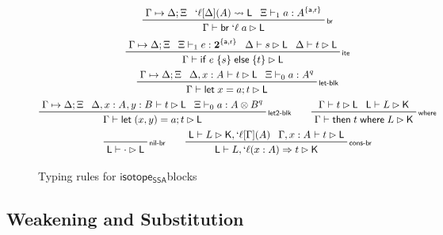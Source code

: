 \documentclass[acmsmall,screen,review]{acmart}
\newcommand{\mb}[1]{\ensuremath{\mathbf{#1}}}
\newcommand{\ms}[1]{\ensuremath{\mathsf{#1}}}
\newcommand{\lbl}[1]{{`#1}}
\newcommand{\lto}{\Rightarrow}
\newcommand{\letstmt}[3]{\ensuremath{\ms{let}\;#1 = #2; #3}}
\newcommand{\brb}[2]{\ms{br}\;#1\;#2}
\newcommand{\lbrb}[2]{\brb{\lbl{#1}}{#2}}
\newcommand{\ite}[3]{\ms{if}\;#1\;\{#2\}\;\ms{else}\;\{#3\}}
\newcommand{\ewhere}[2]{\ms{then}\;#1\;\ms{where}\;#2}
\newcommand{\wbranch}[3]{#1(#2) \lto #3}
\newcommand{\lwbranch}[3]{\wbranch{\lbl{#1}}{#2}{#3}}
\newcommand{\csplits}[3]{#1 \mapsto #2;#3}
\newcommand{\lwk}[2]{#1 \rightsquigarrow #2}
\newcommand{\thyp}[3]{#1: {#2}^{#3}}
\newcommand{\lhyp}[3]{#1[#2](#3)}
\newcommand{\llhyp}[3]{\lhyp{\lbl{#1}}{#2}{#3}}
\newcommand{\rle}[1]{{\scriptsize\textsf{#1}}}
\newcommand{\tint}{{\{\ms{a}, \ms{r}\}}}
\newcommand{\hasty}[5]{#1 \vdash_{#2} #3: {#4}^{#5}}
\newcommand{\haslb}[3]{#1 \vdash #2 \rhd #3}
\newcommand{\lhaslb}[3]{#1 \vdash #2 \rhd #3}
\newcommand{\isotopessa}{\ms{isotope_{SSA}}}
\begin{document}
\begin{figure}
  \begin{gather*}    
    \prftree[r]{\rle{br}}
      {\csplits{\Gamma}{\Delta}{\Xi}}
      {\lwk{\llhyp{\ell}{\Delta}{A}}{\ms{L}}}
      {\hasty{\Xi}{1}{a}{A}{\tint}}
      {\haslb{\Gamma}{\lbrb{\ell}{a}}{\ms{L}}} 
    \\
    \prftree[r]{\rle{ite}}
      {\csplits{\Gamma}{\Delta}{\Xi}}
      {\hasty{\Xi}{1}{e}{\mb{2}}{\tint}}
      {\haslb{\Delta}{s}{\ms{L}}}
      {\haslb{\Delta}{t}{\ms{L}}}
      {\haslb{\Gamma}{\ite{e}{s}{t}}{\ms{L}}} 
    \\
    \prftree[r]{\rle{let-blk}}
      {\csplits{\Gamma}{\Delta}{\Xi}}
      {\haslb{\Delta, \thyp{x}{A}{}}{t}{\ms{L}}}
      {\hasty{\Xi}{0}{a}{A}{q}}
      {\haslb{\Gamma}{\letstmt{x}{a}{t}}{\ms{L}}} 
    \\
    \prftree[r]{\rle{let2-blk}}
      {\csplits{\Gamma}{\Delta}{\Xi}}
      {\haslb{\Delta, \thyp{x}{A}{}, \thyp{y}{B}{}}{t}{\ms{L}}}
      {\hasty{\Xi}{0}{a}{A \otimes B}{q}}
      {\haslb{\Gamma}{\letstmt{(x, y)}{a}{t}}{\ms{L}}} \qquad
    \prftree[r]{\rle{where}}
      {\haslb{\Gamma}{t}{\ms{L}}}
      {\lhaslb{\ms{L}}{L}{\ms{K}}}
      {\haslb{\Gamma}{\ewhere{t}{L}}{\ms{K}}}
    \\
    \prftree[r]{\rle{nil-br}}
      {\lhaslb{\ms{L}}{\cdot}{\ms{L}}} \qquad
    \prftree[r]{\rle{cons-br}}
      {\lhaslb{\ms{L}}{L}{\ms{K}, \llhyp{\ell}{\Gamma}{A}}}
      {\haslb{\Gamma, \thyp{x}{A}{}}{t}{\ms{L}}}
      {\lhaslb{\ms{L}}{L, \lwbranch{\ell}{x: A}{t}}{\ms{K}}}
  \end{gather*}
  \caption{Typing rules for \isotopessa blocks}
  \label{fig:ssa-block-typing}
\end{figure}

\subsection{Weakening and Substitution}
\end{document}
